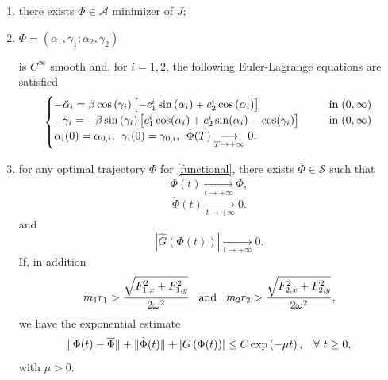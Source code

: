 \documentclass{aims}
\theoremstyle{definition}
\begin{document}
	\begin{enumerate}
		\item there exists $\Phi\in \mathscr{A}$ minimizer of $J$;
		\item $\Phi=\left(\alpha_1,\gamma_1;\alpha_2,\gamma_2\right)$

		is $C^{\infty}$ smooth and, for $i=1,2$, the following Euler-Lagrange equations are satisfied
		\begin{equation}\label{EL_new}
		\begin{cases}
		-\ddot{\alpha}_i=\beta\cos\left(\gamma_i\right)\left[-c^i_1\sin\left(\alpha_i\right)+c^i_2\cos\left(\alpha_i\right)\right]\hspace{0.6 cm}  &\mbox{in} \hspace{0.10 cm}(0,\infty)\\
		-\ddot{\gamma}_i=-\beta\sin\left(\gamma_i\right)\left[c^i_1\cos(\alpha_i)+c^i_2\sin(\alpha_i)-\cos(\gamma_i)\right]\hspace{0.6 cm}  &\mbox{in} \hspace{0.10 cm}(0,\infty)\\
		\alpha_i(0)=\alpha_{0,i},\hspace{0.16 cm}\gamma_i(0)=\gamma_{0,i}, \hspace{0.16 cm} \dot{\Phi}(T)\underset{T\to +\infty}{\longrightarrow}0.
		\end{cases}
		\end{equation}
		\item for any optimal trajectory $\Phi$ for \eqref{functional}, there exists $\overline{\Phi}\in\mathscr{S}$ such that
		\begin{equation}\label{prop_group_eq1}
		\Phi(t)\underset{t\to +\infty}{\longrightarrow}\overline{\Phi},
		\end{equation}
		\begin{equation}\label{prop_group_eq2}
		\dot{\Phi}(t)\underset{t\to +\infty}{\longrightarrow}0.
		\end{equation}
		and
		\begin{equation}\label{prop_group_eq3}
		\left|\hat{G}\left(\Phi(t)\right)\right|\underset{t\to +\infty}{\longrightarrow}0.
		\end{equation}
		If, in addition
		\begin{equation}\label{prop_group_eq4}
		m_1r_1 > \frac{\sqrt{F_{1,x}^2+F_{1,y}^2}}{2\omega^2}\hspace{0.3 cm}\mbox{and}\hspace{0.3 cm}m_2r_2> \frac{\sqrt{F_{2,x}^2+F_{2,y}^2}}{2\omega^2},
		\end{equation}
		we have the exponential estimate
		\begin{equation}\label{prop_group_eq6}
		\|\Phi(t)-\overline{\Phi}\|+\|\dot{\Phi}(t)\|+\left|G\left(\Phi(t)\right)\right|\leq C\exp\left(-\mu t\right),\hspace{0.3 cm}\forall \ t\geq 0,
		\end{equation}
		with $\mu >0$.
	\end{enumerate}
	
\end{document}
